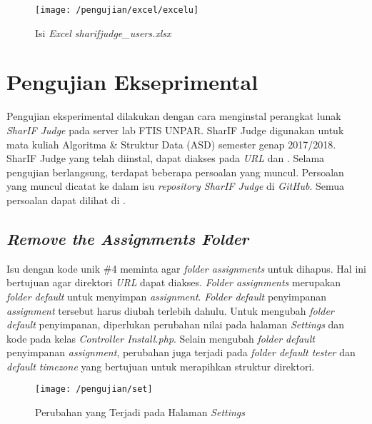 	\begin{figure}[H]
		\centering  
		\texttt{[image: /pengujian/excel/excelu]}  
		\caption[Isi \textit{Excel sharifjudge\_users.xlsx}]{Isi \textit{Excel sharifjudge\_users.xlsx}} 
		\label{fig:excelu} 
	\end{figure}
	
\section{Pengujian Ekseprimental}
Pengujian eksperimental dilakukan dengan cara menginstal perangkat lunak \textit{SharIF Judge} pada server lab FTIS UNPAR. SharIF Judge digunakan untuk mata kuliah Algoritma \& Struktur Data (ASD) semester genap 2017/2018. SharIF Judge yang telah diinstal, dapat diakses pada \textit{URL}  dan . Selama pengujian berlangsung, terdapat beberapa persoalan yang muncul. Persoalan yang muncul dicatat ke dalam isu \textit{repository SharIF Judge} di \textit{GitHub}. Semua persoalan dapat dilihat di .

	\subsection{\textit{Remove the Assignments Folder}}
	Isu dengan kode unik \#4 meminta agar \textit{folder assignments} untuk dihapus. Hal ini bertujuan agar direktori \textit{URL}  dapat diakses. \textit{Folder assignments} merupakan \textit{folder default} untuk menyimpan \textit{assignment}. \textit{Folder default} penyimpanan \textit{assignment} tersebut harus diubah terlebih dahulu. Untuk mengubah \textit{folder default} penyimpanan, diperlukan perubahan nilai pada halaman \textit{Settings} dan kode pada kelas \textit{Controller Install.php}. Selain mengubah \textit{folder default} penyimpanan \textit{assignment}, perubahan juga terjadi pada \textit{folder default tester} dan \textit{default timezone} yang bertujuan untuk merapihkan struktur direktori.
	\begin{figure}[H]
		\centering  
		\texttt{[image: /pengujian/set]}  
		\caption[Perubahan yang Terjadi pada Halaman \textit{Settings}]{Perubahan yang Terjadi pada Halaman \textit{Settings}} 
		\label{fig:set} 
	\end{figure}
	
